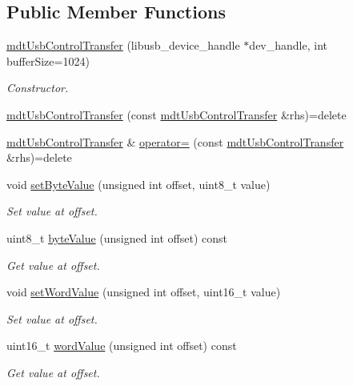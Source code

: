 \subsection*{Public Member Functions}
\begin{DoxyCompactItemize}
\item 
\hyperlink{classmdt_usb_control_transfer_a66bfbc135c55bf10377d68cf23d91d0d}{mdt\-Usb\-Control\-Transfer} (libusb\-\_\-device\-\_\-handle $\ast$dev\-\_\-handle, int buffer\-Size=1024)
\begin{DoxyCompactList}\small\item\em Constructor. \end{DoxyCompactList}\item 
\hyperlink{classmdt_usb_control_transfer_a557dca733fad6dc008b1b42b06031a4c}{mdt\-Usb\-Control\-Transfer} (const \hyperlink{classmdt_usb_control_transfer}{mdt\-Usb\-Control\-Transfer} \&rhs)=delete
\item 
\hyperlink{classmdt_usb_control_transfer}{mdt\-Usb\-Control\-Transfer} \& \hyperlink{classmdt_usb_control_transfer_aae6fd3ed40416911e82f84ea4b457610}{operator=} (const \hyperlink{classmdt_usb_control_transfer}{mdt\-Usb\-Control\-Transfer} \&rhs)=delete
\item 
void \hyperlink{classmdt_usb_control_transfer_a7a146f65c34a21b6c0d2c5221317de2e}{set\-Byte\-Value} (unsigned int offset, uint8\-\_\-t value)
\begin{DoxyCompactList}\small\item\em Set value at offset. \end{DoxyCompactList}\item 
uint8\-\_\-t \hyperlink{classmdt_usb_control_transfer_a628488c2a38647b81fc215ccc2f6dcf2}{byte\-Value} (unsigned int offset) const 
\begin{DoxyCompactList}\small\item\em Get value at offset. \end{DoxyCompactList}\item 
void \hyperlink{classmdt_usb_control_transfer_a721de2015fb87a32a555c4c4eb2d11f2}{set\-Word\-Value} (unsigned int offset, uint16\-\_\-t value)
\begin{DoxyCompactList}\small\item\em Set value at offset. \end{DoxyCompactList}\item 
uint16\-\_\-t \hyperlink{classmdt_usb_control_transfer_a39aec348c12e466f7774bd5223b745fc}{word\-Value} (unsigned int offset) const 
\begin{DoxyCompactList}\small\item\em Get value at offset. \end{DoxyCompactList}\item 

\end{DoxyCompactItemize}
